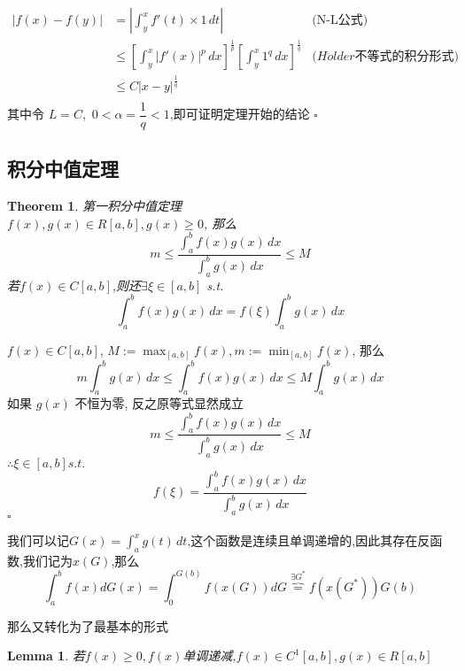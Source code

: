 \documentclass[11pt,hyperref,a4paper,UTF8]{ctexart}
\newtheorem{theorem}{Theorem}[subsection]
\newtheorem{lemma}{Lemma}[subsection]
\newenvironment{cproof}{%
\heiti{证明}\kaishu
}{%
  \hfill $\square$
  \par\bigskip
}
\newcommand{\bracket}[1]{\left[#1\right]}
\newcommand{\abs}[1]{\left|#1\right|}
\begin{document}
\begin{CJK}{UTF8}{gkai}
\begin{cproof}

\[
\begin{aligned}
  \abs{f(x) - f(y)} &= \abs{\int_{y}^{x} f'(t) \times 1 \,dt}&\text{(N-L公式)}\\
  &\leq \bracket{\int_{y}^{x} |f'(x)|^p \, dx}^{\frac{1}{p}} \bracket{\int_{y}^{x} 1^q \, dx}^{\frac{1}{q}}&\text{($H\ddot{o}lder$不等式的积分形式)}\\
  &\leq C \abs{x - y}^{\frac{1}{q}} \\
\end{aligned}  
\]
其中令 $L = C$,~$0 < \alpha = \dfrac{1}{q} < 1$,即可证明定理开始的结论
\end{cproof}

\subsection{积分中值定理}

\begin{theorem}
  第一积分中值定理\\

  $f(x),g(x) \in R[a,b],g(x) \geq 0$, 那么 
  \[m \leq \dfrac{\int_{a}^{b}f(x)g(x)\, dx}{\int_{a}^{b}g(x)\,dx} \leq M\]
  若$f(x) \in C[a,b]$,则还$\exists \xi \in [a,b]$ s.t.
  \[\int_{a}^{b} f(x)g(x) \, dx = f(\xi) \int_{a}^{b}g(x)\, dx\]
\end{theorem}

\begin{cproof}
  $f(x) \in C[a,b]$, $M:= \max_{[a,b]} f(x), m:= \min_{[a,b]} f(x)$, 那么
  \[m \int_{a}^{b}g(x)\, dx \leq \int_{a}^{b}f(x) g(x)\, dx \leq M \int_{a}^{b}g(x)\, dx\]
  如果 $g(x)$ 不恒为零, 反之原等式显然成立
  \[m \leq \dfrac{\int_{a}^{b}f(x)g(x)\, dx}{\int_{a}^{b}g(x)\,dx} \leq M\]
  $\therefore \xi \in [a,b] s.t.$
  \[f(\xi) = \dfrac{\int_{a}^{b}f(x)g(x)\, dx}{\int_{a}^{b}g(x)\,dx} \]
\end{cproof}

我们可以记$G(x) = \int_{a}^{x} g(t)\,dt$,这个函数是连续且单调递增的,因此其存在反函数,我们记为$x(G)$,那么
\[\int_{a}^{b} f(x) d G(x) = \int_{0}^{G(b)} f(x(G)) d G \overbrace{=}^{\exists G^\ast} f(x(G^\ast)) G(b)\]

那么又转化为了最基本的形式

\begin{lemma}
  若$f(x) \geq 0, f(x)$单调递减,$f(x)\in C^1[a,b],g(x) \in R[a,b]$
\end{lemma}


\end{CJK}
\end{document}
